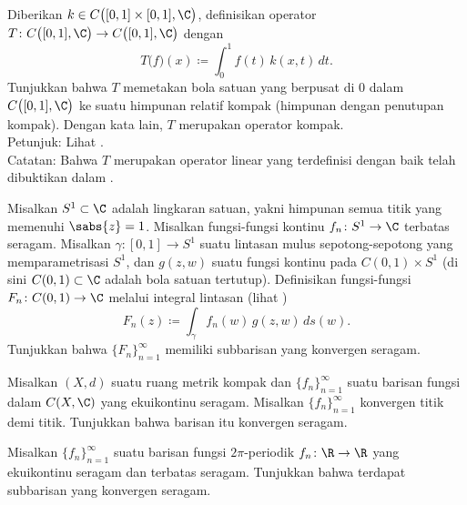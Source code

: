 \begin{samepage}
\begin{exercise}
Diberikan $k \in C\bigl([0,1]\times [0,1],\C\bigr)$,
definisikan operator
$T \colon C\bigl([0,1],\C\bigr) \to C\bigl([0,1],\C\bigr)$ dengan
\begin{equation*}
T\bigl(f\bigr)(x) \coloneqq  \int_0^1 f(t) \, k(x,t)\,dt .
\end{equation*}
Tunjukkan bahwa $T$ memetakan bola satuan yang berpusat di 0 dalam $C\bigl([0,1],\C\bigr)$ ke suatu
himpunan relatif kompak (himpunan dengan penutupan kompak).
Dengan kata lain, $T$ merupakan operator kompak.\\
Petunjuk: Lihat .
\\
Catatan: Bahwa $T$ merupakan operator linear yang terdefinisi dengan baik telah dibuktikan dalam
.
\end{exercise}
\end{samepage}

\begin{exercise}
Misalkan $S^1 \subset \C$ adalah lingkaran satuan, yakni himpunan semua titik yang memenuhi
$\sabs{z}=1$.  Misalkan fungsi-fungsi kontinu
$f_n \colon S^1 \to \C$ terbatas seragam.
Misalkan $\gamma \colon [0,1] \to S^1$ suatu lintasan mulus sepotong-sepotong yang memparametrisasi $S^1$,
dan $g(z,w)$ suatu fungsi kontinu pada $C(0,1) \times S^1$
(di sini $C(0,1) \subset \C$ adalah bola satuan tertutup).  Definisikan
fungsi-fungsi $F_n \colon C(0,1) \to \C$ melalui
integral lintasan (lihat )
\begin{equation*}
F_n(z) \coloneqq \int_\gamma f_n(w)\, g(z,w) \, ds(w) . 
\end{equation*}
Tunjukkan bahwa $\{ F_n \}_{n=1}^\infty$ memiliki subbarisan yang konvergen seragam.
\end{exercise}

\begin{exercise}
Misalkan $(X,d)$ suatu ruang metrik kompak dan $\{ f_n \}_{n=1}^\infty$ suatu
barisan fungsi dalam $C(X,\C)$ yang ekuikontinu seragam.  Misalkan
$\{ f_n \}_{n=1}^\infty$ konvergen titik demi titik.  Tunjukkan bahwa barisan itu konvergen seragam.
\end{exercise}

\begin{exercise}
Misalkan $\{ f_n \}_{n=1}^\infty$ suatu barisan fungsi
$2\pi$-periodik $f_n \colon \R \to \R$ yang ekuikontinu seragam dan terbatas seragam.  Tunjukkan bahwa terdapat
subbarisan yang konvergen seragam.
\end{exercise}

